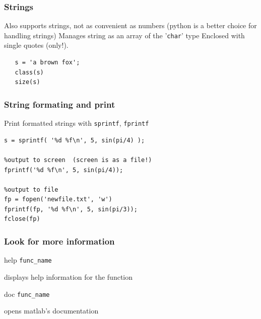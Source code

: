\documentclass[11pt]{beamer}
\begin{document}
\iffalse
\begin{frame}[fragile]
  \frametitle{Strings}
  \Enlarge

  \begin{enumerate}
  \myitem  Also supports strings, not as convenient as numbers (python is a better choice for handling strings) \pause
  \myitem Manages string as an array of the '\texttt{char}' type \pause
  \myitem  Enclosed with single quotes (only!).
  \end{enumerate}
  
  \begin{Verbatim}
   s = 'a brown fox';
   class(s)
   size(s)
  \end{Verbatim}
\end{frame}

\begin{frame}[fragile]
  \frametitle{String formating and print}
  \Enlarge

  \begin{enumerate}
  \myitem  Print formatted strings with \texttt{sprintf}, \texttt{fprintf}
  \begin{Verbatim}
s = sprintf( '%d %f\n', 5, sin(pi/4) ); 

%output to screen  (screen is as a file!)
fprintf('%d %f\n', 5, sin(pi/4)); 

%output to file
fp = fopen('newfile.txt', 'w')
fprintf(fp, '%d %f\n', 5, sin(pi/3));
fclose(fp)
\end{Verbatim}
\end{enumerate}
  
\end{frame}


\begin{frame}[fragile]
  \frametitle{Look for more information}
  \Enlarge

  \begin{enumerate}
    \myitem  help \texttt{func\_name}   
    	\begin{enumerate}
	\mysubitem displays help information for the function
	\end{enumerate}
    \myitem  doc \texttt{func\_name}   
    	\begin{enumerate}
	\mysubitem opens matlab's documentation
	\end{enumerate}
  \end{enumerate}

\end{frame}
\end{document}
